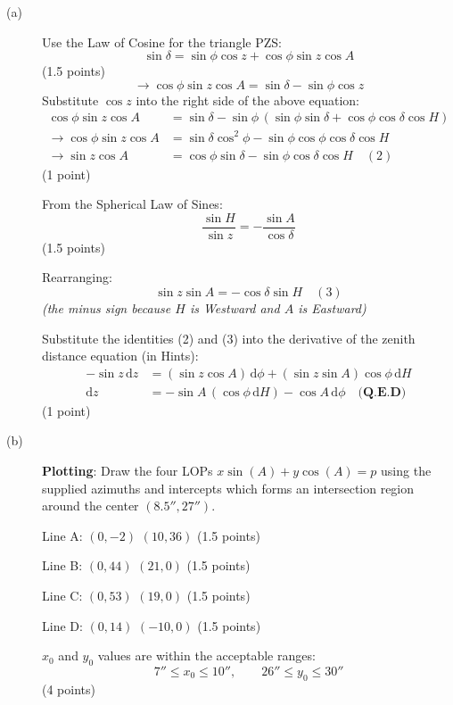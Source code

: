 \begin{description}
\item[(a)] Use the Law of Cosine for the triangle PZS:
  \[
  \sin\delta = \sin\phi \cos z + \cos\phi \sin z \cos A
  \]
  \hfill(1.5 points)
  \[
  \rightarrow \cos\phi \sin z \cos A = \sin\delta - \sin\phi \cos z
  \]
  Substitute $\cos z$ into the right side of the above equation:
  \begin{align*}
    \cos\phi \sin z \cos A
      &= \sin\delta - \sin\phi\,(\sin\phi \sin\delta
         + \cos\phi \cos\delta \cos H) \\
    \rightarrow \cos\phi \sin z \cos A
      &= \sin\delta \cos^2\phi - \sin\phi \cos\phi \cos\delta \cos H \\
    \rightarrow \sin z \cos A
      &= \cos\phi \sin\delta - \sin\phi \cos\delta \cos H \quad (2)
  \end{align*}
  \hfill(1 point)

  From the Spherical Law of Sines:
  \[
  \frac{\sin H}{\sin z} = -\frac{\sin A}{\cos\delta}
  \]
  \hfill(1.5 points)

  Rearranging:
  \[
  \sin z \sin A = -\cos\delta \sin H \quad (3)
  \]
  \emph{(the minus sign because $H$ is Westward and $A$ is Eastward)}

  Substitute the identities (2) and (3) into the derivative of the zenith
  distance equation (in Hints):
  \begin{align*}
    -\sin z\,\mathrm{d}z
      &= (\sin z \cos A)\,\mathrm{d}\phi
         + (\sin z \sin A)\cos\phi\,\mathrm{d}H \\
    \mathrm{d}z &= -\sin A\,(\cos\phi\,\mathrm{d}H) - \cos A\,\mathrm{d}\phi
      \quad \textbf{(Q.E.D)}
  \end{align*}
  \hfill(1 point)

\item[(b)]

  \textbf{Plotting}: Draw the four LOPs $x\sin(A) + y\cos(A) = p$ using the
  supplied azimuths and intercepts which forms an intersection region around
  the center $(8.5'', 27'')$.

  Line A: $(0, -2)$ $(10, 36)$ \hfill(1.5 points)

  Line B: $(0, 44)$ $(21, 0)$ \hfill(1.5 points)

  Line C: $(0, 53)$ $(19, 0)$ \hfill(1.5 points)

  Line D: $(0, 14)$ $(-10, 0)$ \hfill(1.5 points)

  $x_0$ and $y_0$ values are within the acceptable ranges:
  \[
  7'' \le x_0 \le 10'', \qquad 26'' \le y_0 \le 30''
  \]
  \hfill(4 points)
\end{description}

